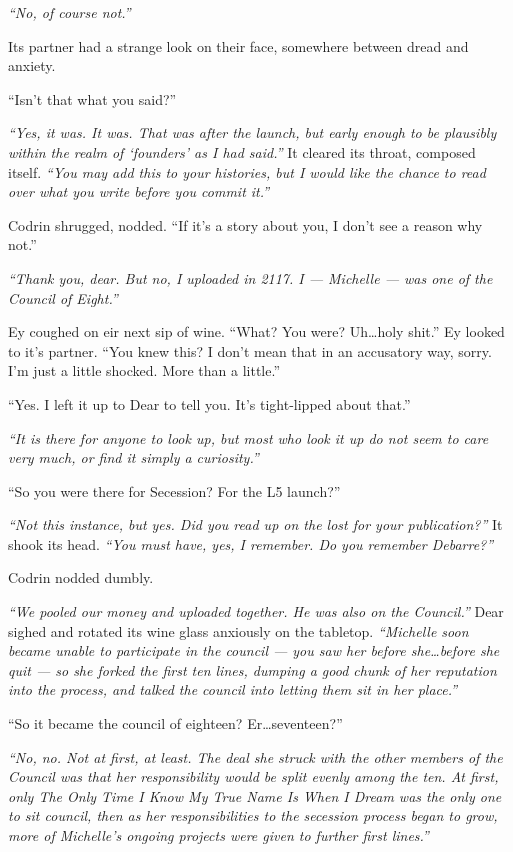 \emph{``No, of course not.''}

Its partner had a strange look on their face, somewhere between dread and anxiety.

``Isn't that what you said?''

\emph{``Yes, it was. It was. That was after the launch, but early enough to be plausibly within the realm of `founders' as I had said.''} It cleared its throat, composed itself. \emph{``You may add this to your histories, but I would like the chance to read over what you write before you commit it.''}

Codrin shrugged, nodded. ``If it's a story about you, I don't see a reason why not.''

\emph{``Thank you, dear. But no, I uploaded in 2117. I — Michelle — was one of the Council of Eight.''}

Ey coughed on eir next sip of wine. ``What? You were? Uh\ldots holy shit.'' Ey looked to it's partner. ``You knew this? I don't mean that in an accusatory way, sorry. I'm just a little shocked. More than a little.''

``Yes. I left it up to Dear to tell you. It's tight-lipped about that.''

\emph{``It is there for anyone to look up, but most who look it up do not seem to care very much, or find it simply a curiosity.''}

``So you were there for Secession? For the L5 launch?''

\emph{``Not this instance, but yes. Did you read up on the lost for your publication?''} It shook its head. \emph{``You must have, yes, I remember. Do you remember Debarre?''}

Codrin nodded dumbly.

\emph{``We pooled our money and uploaded together. He was also on the Council.''} Dear sighed and rotated its wine glass anxiously on the tabletop. \emph{``Michelle soon became unable to participate in the council — you saw her before she\ldots before she quit — so she forked the first ten lines, dumping a good chunk of her reputation into the process, and talked the council into letting them sit in her place.''}

``So it became the council of eighteen? Er\ldots seventeen?''

\emph{``No, no. Not at first, at least. The deal she struck with the other members of the Council was that her responsibility would be split evenly among the ten. At first, only The Only Time I Know My True Name Is When I Dream was the only one to sit council, then as her responsibilities to the secession process began to grow, more of Michelle's ongoing projects were given to further first lines.''}

